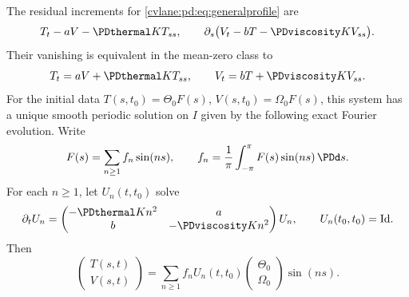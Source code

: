 \begin{cvlanepdproposition}\label{cvlane:pd:prop:profile}
The residual increments for \eqref{cvlane:pd:eq:generalprofile} are
\begin{equation}\label{cvlane:pd:eq:profileR}
 T_t-aV-\PDthermal K T_{ss},\qquad
 \partial_s\big(V_t-bT-\PDviscosity K V_{ss}\big).
\end{equation}
Their vanishing is equivalent in the mean-zero class to
\begin{equation}\label{cvlane:pd:eq:profilePDE}
 T_t=aV+\PDthermal K T_{ss},\qquad
 V_t=bT+\PDviscosity K V_{ss}.
\end{equation}
For the initial data $T(s,t_0)=\Theta_0F(s)$,
$V(s,t_0)=\Omega_0F(s)$, this system has a unique smooth periodic solution
on $I$ given by the following exact Fourier evolution. Write
\begin{equation}\label{cvlane:pd:eq:fourier}
 F(s)=\sum_{n\geq1} f_n\sin(ns),\qquad
 f_n=\frac1\pi\int_{-\pi}^{\pi}F(s)\sin(ns)\,\PDd s.
\end{equation}
For each $n\geq1$, let $U_n(t,t_0)$ solve
\begin{equation}\label{cvlane:pd:eq:Un}
 \partial_t U_n=
 \begin{pmatrix}-\PDthermal K n^2&a\\b&-\PDviscosity K n^2\end{pmatrix}U_n,
 \qquad U_n(t_0,t_0)=\mathrm{Id}.
\end{equation}
Then
\begin{equation}\label{cvlane:pd:eq:profileSolution}
 \begin{pmatrix}T(s,t)\\V(s,t)\end{pmatrix}
 =\sum_{n\geq1}f_n U_n(t,t_0)
       \begin{pmatrix}\Theta_0\\\Omega_0\end{pmatrix}\sin(ns).
\end{equation}
\end{cvlanepdproposition}
